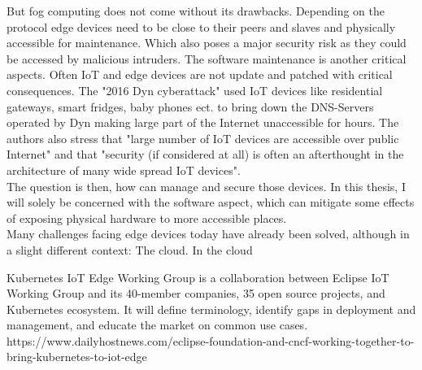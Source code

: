 {But fog computing does not come without its drawbacks. Depending on the protocol edge devices need to be close to their peers and slaves and physically accessible for maintenance. Which also poses a major security risk as they could be accessed by malicious intruders. The software maintenance is another critical aspects. Often IoT and edge devices are not update and patched with critical consequences. The "2016 Dyn cyberattack" used IoT devices like residential gateways, smart fridges, baby phones ect. to bring down the DNS-Servers operated by Dyn making large part of the Internet unaccessible for hours\cite{dynAttack}. The authors also stress that "large number of IoT devices are accessible over public Internet" and that "security (if considered at all) is often an afterthought in the architecture of many wide spread IoT devices"\cite{dynAttack}.\\
The question is then, how can manage and secure those devices. In this thesis, I will solely be concerned with the software aspect, which can mitigate some effects of exposing physical hardware to more accessible places.\\
Many challenges facing edge devices today have already been solved, although in a slight different context: The cloud\cite{IntroducingDejanBosanac:KubernetesIoTEdgeWorkingGroup}. In the cloud 





Kubernetes IoT Edge Working Group is a collaboration between Eclipse IoT Working Group and its 40-member companies, 35 open source projects, and Kubernetes ecosystem. It will define terminology, identify gaps in deployment and management, and educate the market on common use cases.
https://www.dailyhostnews.com/eclipse-foundation-and-cncf-working-together-to-bring-kubernetes-to-iot-edge
}
